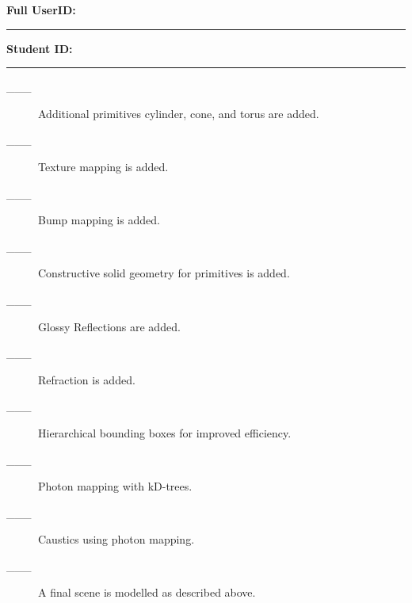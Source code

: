 \documentclass {article}
\begin{document}
\newpage



{\hfill{\bf Full UserID:\rule{2in}{.1mm}}\hfill{\bf Student ID:\rule{2in}{.1mm}}\hfill}

\begin{description}
     \item[\_\_\_]  Additional primitives cylinder, cone, and torus are added.

     \item[\_\_\_]  Texture mapping is added.

     \item[\_\_\_]  Bump mapping is added.

     \item[\_\_\_]  Constructive solid geometry for primitives is added.

     \item[\_\_\_]  Glossy Reflections are added.

     \item[\_\_\_]  Refraction is added.

     \item[\_\_\_]  Hierarchical bounding boxes for improved efficiency.

     \item[\_\_\_]  Photon mapping with kD-trees.

     \item[\_\_\_]  Caustics using photon mapping.

     \item[\_\_\_]  A final scene is modelled as described above.
\end{description}
\end{document}
